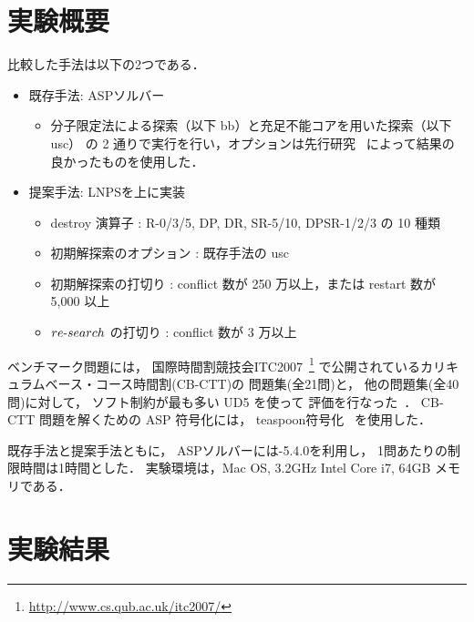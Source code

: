 \section{実験概要}
比較した手法は以下の2つである．
\begin{itemize}\compress
\item 既存手法: ASPソルバー{\clingo}
 \begin{itemize}
  \item 分子限定法による探索（以下 bb）と充足不能コアを用いた探索（以下 usc）
  の 2 通りで実行を行い，オプションは先行研究~\cite{anor/Banbara2019}
  によって結果の良かったものを使用した．
 \end{itemize}
\item 提案手法: LNPSを{\clingo}上に実装
 \begin{itemize}
  \item destroy 演算子 : R-0/3/5, DP, DR, SR-5/10, DPSR-1/2/3 の 10 種類
  \item 初期解探索のオプション : 既存手法の usc
  \item 初期解探索の打切り : conflict 数が 250 万以上，または restart 数が 5,000 以上
  \item $re\mathchar`-search$ の打切り : conflict 数が 3 万以上
 \end{itemize}
\end{itemize}

ベンチマーク問題には，
国際時間割競技会ITC2007~\footnote{%
  \url{http://www.cs.qub.ac.uk/itc2007/}}
で公開されているカリキュラムベース・コース時間割(CB-CTT)の
問題集(全21問)と，
他の問題集(全40問)に対して，
ソフト制約が最も多い UD5 を使って
評価を行なった~\cite{GasperoMS/ITC2007,DBLP:journals/anor/BonuttiCGS12}．
CB-CTT 問題を解くための ASP 符号化には，
\textsf{teaspoon}符号化~\cite{anor/Banbara2019}
を使用した．
%

既存手法と提案手法ともに，
ASPソルバーには{\clingo}-5.4.0を利用し，
1問あたりの制限時間は1時間とした．
実験環境は，Mac OS, 3.2GHz Intel Core i7, 64GB メモリである．

\section{実験結果}

